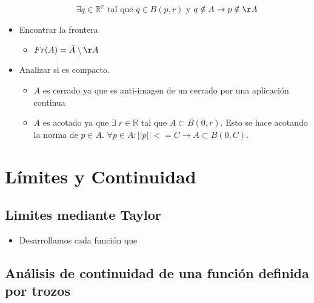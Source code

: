 \documentclass[twoside]{article}
\newcommand{\s}{\hspace{20pt}}
\newcommand{\ex}{\exists \;}
\begin{document}
\begin{itemize}
\begin{itemize}
\begin{itemize}
$\s \s \exists q \in \mathbb{R^n}$ tal que $q \in B(p,r)$ y $q \notin A \rightarrow p \notin \AA$

\end{itemize}
\end{itemize}

\item Encontrar la frontera

\begin{itemize}
\item $Fr(A) = \bar{A} \setminus \AA$
\end{itemize}

\item Analizar si es compacto.

\begin{itemize}

\item $A$ es cerrado ya que es anti-imagen de un cerrado por una aplicación continua

\item $A$ es acotado ya que $\ex r \in \mathbb{R}$ tal que $A \subset B(0,r)$. Esto se hace acotando la norma de $p \in A$. $\forall p \in A: ||p|| <= C \rightarrow A \subset B(0,C).$
\end{itemize}
\end{itemize}

\section{Límites y Continuidad}

\subsection{Limites mediante Taylor}

\begin{itemize}

\item Desarrollamos cada función que 
\end{itemize}
\subsection{Análisis de continuidad de una función definida por trozos}
\end{document}

